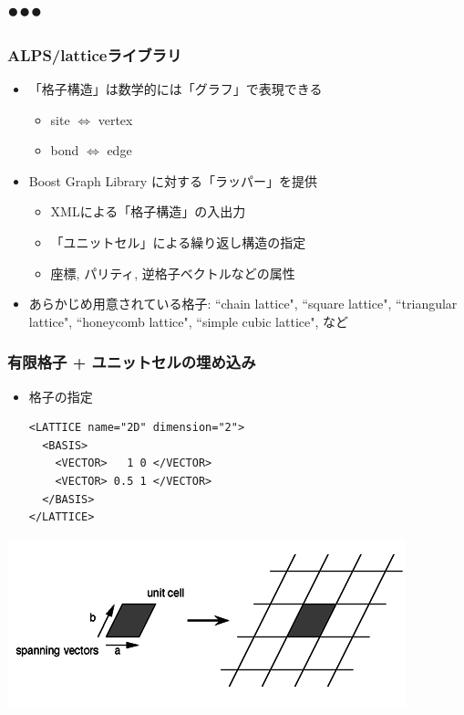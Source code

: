 \subsection*{{\protect\color{red}●}{\protect\color{blue}●}{\protect\color{green}●}}

\begin{frame}
  \frametitle{ALPS/latticeライブラリ}
  \begin{itemize}
    \setlength{\itemsep}{1em}
  \item 「格子構造」は数学的には「グラフ」で表現できる
    \begin{itemize}
    \item site $\Leftrightarrow$ vertex
    \item bond $\Leftrightarrow$ edge
    \end{itemize}
  \item Boost Graph Library に対する「ラッパー」を提供
    \begin{itemize}
    \item XMLによる「格子構造」の入出力
    \item 「ユニットセル」による繰り返し構造の指定
    \item 座標, パリティ, 逆格子ベクトルなどの属性
    \end{itemize}
  \item あらかじめ用意されている格子: ``chain lattice", ``square lattice", ``triangular lattice", ``honeycomb lattice", ``simple cubic lattice", など
  \end{itemize}
\end{frame}

\begin{frame}[t,fragile]
  \frametitle{有限格子 + ユニットセルの埋め込み}
  \begin{itemize}
  \item 格子の指定
  \begin{lstlisting}
<LATTICE name="2D" dimension="2">
  <BASIS>
    <VECTOR>   1 0 </VECTOR>
    <VECTOR> 0.5 1 </VECTOR>
  </BASIS>
</LATTICE>
\end{lstlisting}
  \end{itemize}
  \begin{center}
    \includegraphics[height=0.3\textheight]{TutorialLatticeHOWTOLattice1}
  \end{center}
\end{frame}

